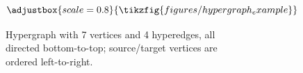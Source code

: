 \begin{figure}
	\begin{subfigure}[c]{0.3\linewidth}
		\centering


		\[
			\adjustbox{scale=0.8}{
				\tikzfig{figures/hypergraph_example}
			}
		\]
		\caption{Hypergraph with 7 vertices and 4 hyperedges, all directed bottom-to-top; source/target vertices are ordered left-to-right.}%
		\label{fig:hypergraph}
	\end{subfigure}
	\begin{subfigure}[c]{0.3\linewidth}
		\centering




\end{subfigure}
\end{figure}
